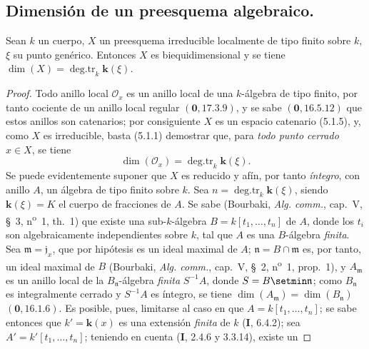 
\subsection{Dimensión de un preesquema algebraico.}

\begin{proposition}[5.2.1]
\label{IV.2.5.2.1-fr}
Sean $k$ un cuerpo, $X$ un preesquema irreducible localmente de tipo finito
sobre $k$, $\xi$ su punto genérico. Entonces $X$ es biequidimensional y se tiene
$\dim(X)=\operatorname{deg.tr}_k \boldsymbol{k}(\xi)$.
\end{proposition}

\begin{proof}
Todo anillo local $\mathcal O_x$ es un anillo local de una $k$-álgebra de tipo
finito, por tanto cociente de un anillo local regular $(\mathbf{0},17.3.9)$, y se sabe
$(\mathbf{0},16.5.12)$ que estos anillos son catenarios; por consiguiente $X$ es un
espacio catenario (5.1.5), y, como $X$ es irreducible, basta (5.1.1) demostrar
que, para \emph{todo punto cerrado} $x\in X$, se tiene
\begin{equation}
\dim(\mathcal O_x)=\operatorname{deg.tr}_k \boldsymbol{k}(\xi).
\tag{5.2.1.1}\label{IV.2.5.2.1.1-fr}
\end{equation}
Se puede evidentemente suponer que $X$ es reducido y afín, por tanto
\emph{íntegro}, con anillo $A$, un álgebra de tipo finito sobre $k$. Sea
$n=\operatorname{deg.tr}_k \boldsymbol{k}(\xi)$, siendo $\boldsymbol{k}(\xi)=K$ el cuerpo de fracciones
de $A$. Se sabe (Bourbaki, \emph{Alg. comm.}, cap.~V, \S~3,
n\textsuperscript{o}~1, th.~1) que existe una sub-$k$-álgebra
$B=k[t_1,\ldots,t_n]$ de $A$, donde los $t_i$ son algebraicamente independientes
sobre $k$, tal que $A$ es una $B$-álgebra \emph{finita}. Sea
$\mathfrak m=\mathfrak j_x$, que por hipótesis es un ideal maximal de $A$;
$\mathfrak n=B\cap\mathfrak m$ es, por tanto, un ideal maximal de $B$
(Bourbaki, \emph{Alg. comm.}, cap.~V, \S~2, n\textsuperscript{o}~1, prop.~1),
y $A_{\mathfrak m}$ es un anillo local de la $B_{\mathfrak n}$-álgebra
\emph{finita} $S^{-1}A$, donde $S=B\setmin\mathfrak n$; como $B_{\mathfrak n}$ es
integralmente cerrado y $S^{-1}A$ es íntegro, se tiene
$\dim(A_{\mathfrak m})=\dim(B_{\mathfrak n})$ $(\mathbf{0},16.1.6)$. Es posible, pues,
limitarse al caso en que $A=k[t_1,\ldots,t_n]$; se sabe entonces que
$k'=\boldsymbol{k}(x)$ es una extensión \emph{finita} de $k$ (\textbf I, 6.4.2); sea
$A'=k'[t_1,\ldots,t_n]$; teniendo en cuenta (\textbf I, 2.4.6 y 3.3.14), existe un

\end{proof}
